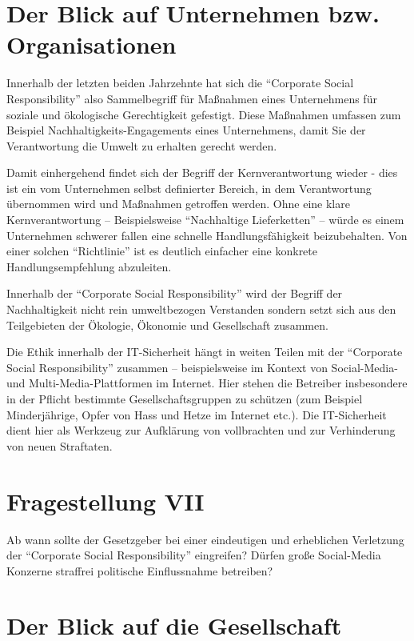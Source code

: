 \documentclass[journal]{IEEEtran}
\begin{document}
\begin{onecolumn}
\newpage

\section{Der Blick auf Unternehmen bzw. Organisationen}

Innerhalb der letzten beiden Jahrzehnte hat sich die ``Corporate Social Responsibility''
also Sammelbegriff für Maßnahmen eines Unternehmens für soziale und ökologische 
Gerechtigkeit gefestigt. Diese Maßnahmen umfassen zum Beispiel 
Nachhaltigkeits-Engagements eines Unternehmens, damit Sie der Verantwortung die Umwelt zu 
erhalten gerecht werden. 

Damit einhergehend findet sich der Begriff der Kernverantwortung wieder - dies ist ein vom
Unternehmen selbst definierter Bereich, in dem Verantwortung übernommen wird und Maßnahmen
getroffen werden. Ohne eine klare Kernverantwortung – Beispielsweise ``Nachhaltige 
Lieferketten'' – würde es einem Unternehmen schwerer fallen eine schnelle 
Handlungsfähigkeit beizubehalten. Von einer solchen ``Richtlinie'' ist es deutlich 
einfacher eine konkrete Handlungsempfehlung abzuleiten.

Innerhalb der ``Corporate Social Responsibility'' wird der Begriff der Nachhaltigkeit 
nicht rein umweltbezogen Verstanden sondern setzt sich aus den Teilgebieten der Ökologie,
Ökonomie und Gesellschaft zusammen. 

Die Ethik innerhalb der IT-Sicherheit hängt in weiten Teilen mit der ``Corporate Social
Responsibility'' zusammen – beispielsweise im Kontext von Social-Media- und 
Multi-Media-Plattformen im Internet. Hier stehen die Betreiber insbesondere in der
Pflicht bestimmte Gesellschaftsgruppen zu schützen (zum Beispiel Minderjährige, Opfer
von Hass und Hetze im Internet etc.). Die IT-Sicherheit dient hier als Werkzeug zur
Aufklärung von vollbrachten und zur Verhinderung von neuen Straftaten.

\section*{Fragestellung VII}

Ab wann sollte der Gesetzgeber bei einer eindeutigen und erheblichen Verletzung der 
``Corporate Social Responsibility'' eingreifen? Dürfen große Social-Media Konzerne 
straffrei politische Einflussnahme betreiben?

\section{Der Blick auf die Gesellschaft}


\end{onecolumn}
\end{document}
